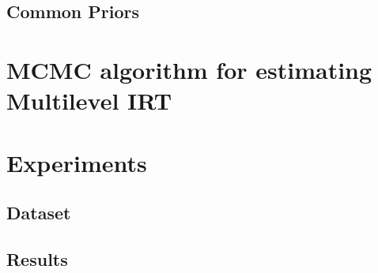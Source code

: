 \documentclass[12pt]{article}
\begin{document}
\subsection{Common Priors}

\section{MCMC algorithm for estimating Multilevel IRT}

\section{Experiments}
\subsection{Dataset}

\subsection{Results}







\end{document}
